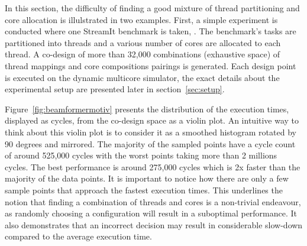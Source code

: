 In this section, the difficulty of finding a good mixture of thread partitioning and core allocation is illulstrated in two examples.
First, a simple experiment is conducted where one StreamIt benchmark is taken, .
The benchmark's tasks are partitioned into threads and a various number of cores are allocated to each thread.
A co-design of more than 32,000 combinations (exhaustive space) of thread mappings and core compositions pairings is generated.
Each design point is executed on the dynamic multicore simulator, the exact details about the experimental setup are presented later in section~\ref{sec:setup}.

Figure~\ref{fig:beamformermotiv} presents the distribution of the execution times, displayed as cycles, from the co-design space as a violin plot.
An intuitive way to think about this violin plot is to consider it as a smoothed histogram rotated by 90 degrees and mirrored.
The majority of the sampled points have a cycle count of around 525,000 cycles with the worst points taking more than 2 millions cycles.
The best performance is around 275,000 cycles which is 2x faster than the majority of the data points.
It is important to notice how there are only a few sample points that approach the fastest execution times.
This underlines the notion that finding a combination of threads and cores is a non-trivial endeavour, as randomly choosing a configuration will result in a suboptimal performance.
It also demonstrates that an incorrect decision may result in considerable slow-down compared to the average execution time.

